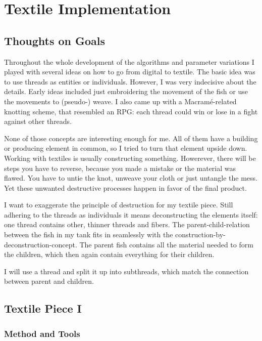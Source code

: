 \documentclass{scrartcl}
\begin{document}
\section{Textile Implementation}
\subsection{Thoughts on Goals}

Throughout the whole development of the algorithms and parameter variations I played with several ideas on how to go from digital to textile. The basic idea was to use threads as entities or individuals. However, I was very indecisive about the details. Early ideas included just embroidering the movement of the fish or use the movements to (pseudo-) weave. I also came up with a Macramé-related knotting scheme, that resembled an RPG: each thread could win or lose in a fight against other threads. 

None of those concepts are interesting enough for me. All of them have a building or producing element in common, so I tried to turn that element upside down.
Working with textiles is usually constructing something. Howerever, there will be steps you have to reverse, because you made a mistake or the material was flawed. You have to untie the knot, unweave your cloth or just untangle the mess. Yet these unwanted destructive processes happen in favor of the final product.

I want to exaggerate the principle of destruction for my textile piece.
Still adhering to the threads as individuals it means deconstructing the elements itself: one thread contains other, thinner threads and fibers.
The parent-child-relation between the fish in my tank fits in seamlessly with the construction-by-deconstruction-concept. The parent fish contains all the material needed to form the children, which then again contain everything for their children.

I will use a thread and split it up into subthreads, which match the connection between parent and children.


\subsection{Textile Piece I}
\subsubsection{Method and Tools}
\end{document}
